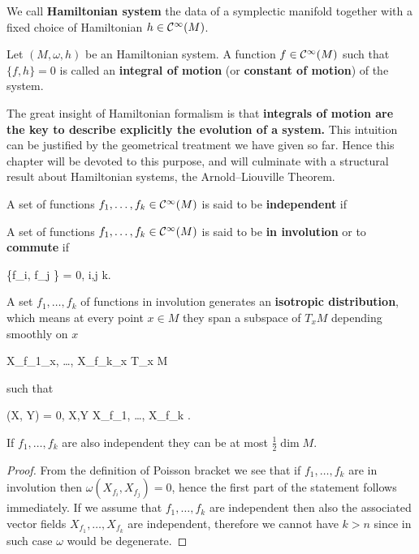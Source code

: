 \documentclass[main.tex]{subfiles}
\begin{document}
\begin{definition}
	We call \textbf{Hamiltonian system} the data of a symplectic manifold together with a fixed choice of Hamiltonian $h \in \mathcal{C}^\infty(M)$.
\end{definition}

\begin{definition}
	Let $(M, \omega, h)$ be an Hamiltonian system. A function $f \in \mathcal{C}^\infty(M)$ such that $\{f,h\} = 0$ is called an \textbf{integral of motion} (or \textbf{constant of motion}) of the system.
\end{definition}

The great insight of Hamiltonian formalism is that \textbf{integrals of motion are the key to describe explicitly the evolution of a system.} This intuition can be justified by the geometrical treatment we have given so far. Hence this chapter will be devoted to this purpose, and will culminate with a structural result about Hamiltonian systems, the Arnold--Liouville Theorem.

\begin{definition}
	A set of functions $f_1, \ldots, f_k \in \mathcal{C}^\infty(M)$ is said to be \textbf{independent} if
	\begin{eqalign}
	\end{eqalign}
\end{definition}

\begin{definition}
	A set of functions $f_1, \ldots, f_k \in \mathcal{C}^\infty(M)$ is said to be \textbf{in involution} or to \textbf{commute} if
	\begin{eqalign}
		\{f_i, f_j \} = 0, \quad \forall i,j \leq k.
	\end{eqalign}
\end{definition}

\begin{lemma}
\label{lemma:isotropic_dist}
	A set $f_1, \ldots, f_k$ of functions in involution generates an \textbf{isotropic distribution}, which means at every point $x \in M$ they span a subspace of $T_xM$ depending smoothly on $x$
	\begin{eqalign}
		\langle X_{f_1}\vert_x, \ldots, X_{f_k}\vert_x \rangle {}\subseteq T_x M
	\end{eqalign}
	such that
	\begin{eqalign}
		\omega(X, Y) = 0, \quad \forall X,Y \in \langle X_{f_1}, \ldots, X_{f_k} \rangle.
	\end{eqalign}
	If $f_1, \ldots, f_k$ are also independent they can be at most $\frac12 \dim M$.
\end{lemma}
\begin{proof}
	From the definition of Poisson bracket we see that if $f_1, \ldots, f_k$ are in involution then $\omega(X_{f_i}, X_{f_j}) = 0$, hence the first part of the statement follows immediately. If we assume that  $f_1, \ldots, f_k$ are independent then also the associated vector fields $X_{f_1}, \dots, X_{f_k}$ are independent, therefore we cannot have $k > n$ since in such case $\omega$ would be degenerate.
\end{proof}
\end{document}
